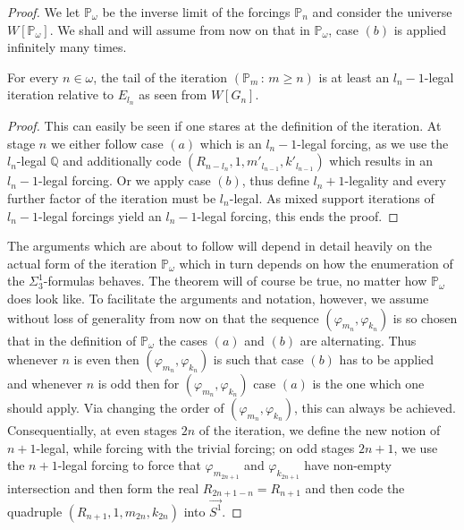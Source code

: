 \documentclass[10pt,a4paper]{amsart}
\newcommand{\forceP}{\mathbb{P}}
\newcommand{\forceQ}{\mathbb{Q}}
\begin{document}
\begin{proof}
We let $\forceP_{\omega}$ be the inverse limit of the forcings $\forceP_n$ and consider the universe $W[\forceP_{\omega}]$.
We shall and will assume from now on that in $\forceP_{\omega}$, case $(b)$ is applied infinitely many times. 
\begin{lemma}
For every $n \in \omega$, the tail of the iteration $(\forceP_m \, :\, m \ge n)$ is at least an $l_n-1$-legal iteration relative to $E_{l_n}$ as seen from $W[G_n]$.
\end{lemma}
\begin{proof}
This can easily  be seen if one stares at the definition of the iteration. 
At stage $n$ we either follow case $(a)$ which is an $l_n -1$-legal forcing, as we use the $l_n$-legal $\forceQ$ and additionally code $(R_{{n-l_n}}, 1,m'_{l_{n-1}},k'_{l_{n-1}} )$ which results in an $l_n-1$-legal forcing. Or we apply case $(b)$, thus define $l_n+1$-legality and every further factor of the iteration must be $l_n$-legal. As mixed support iterations of $l_{n}-1$-legal forcings yield an $l_n -1$-legal forcing, this ends the proof.

\end{proof}

The arguments which are about to follow will depend in detail heavily on the actual form of the iteration $\forceP_{\omega}$ which in turn depends on how the enumeration of the $\Sigma^1_3$-formulas behaves. The theorem will of course be true, no matter how $\forceP_{\omega}$ does look like. To facilitate the arguments and notation, however, we assume without loss of generality from now on that the sequence $(\varphi_{m_n}, \varphi_{k_n})$ is so chosen that in the definition of $\forceP_{\omega}$ the cases $(a)$ and $(b)$ are alternating. Thus whenever $n$ is even then $(\varphi_{m_n}, \varphi_{k_n})$ is such that case $(b)$ has to be applied and whenever $n$ is odd then for $(\varphi_{m_n}, \varphi_{k_n})$ case $(a)$ is the one which one should apply. Via changing the order of $(\varphi_{m_n}, \varphi_{k_n})$, this can always be achieved. Consequentially, at even stages $2n$ of the iteration, we define the new notion of $n+1$-legal, while forcing with the trivial forcing; on odd stages $2n+1$, we use the $n+1$-legal forcing to force that $\varphi_{m_{2n+1}}$ and $\varphi_{k_{2n+1}}$ have non-empty intersection and then form the real $R_{2n+1 -n} =R_{n+1}$ and then  code the quadruple $(R_{n+1},1,m_{2n},k_{2n})$ into $\vec{S^1}$.


\end{proof}
\end{document}
